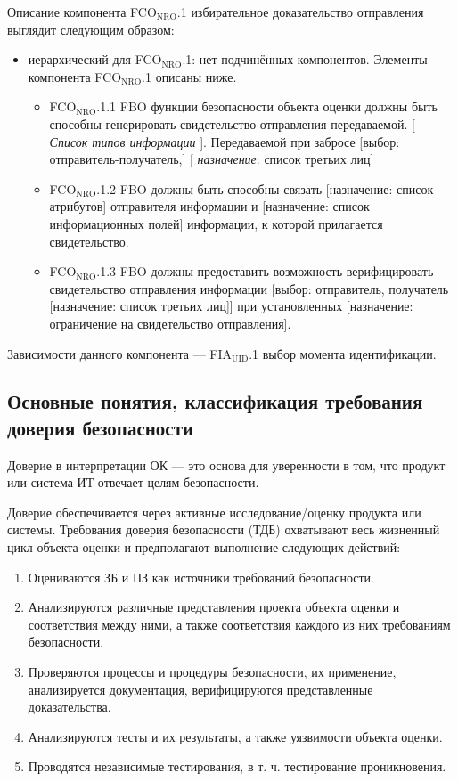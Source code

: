 \documentclass[12pt, russian, oneside, article]{ncc}
\begin{document}
Описание компонента FCO$_{\mathrm{NRO}}$.1 избирательное доказательство отправления выглядит следующим образом:
\begin{itemize}
\item иерархический для FCO$_{\mathrm{NRO}}$.1: нет подчинённых компонентов. Элементы компонента FCO$_{\mathrm{NRO}}$.1 описаны ниже.

\begin{itemize}
\item FCO$_{\mathrm{NRO}}$.1.1 FBO функции безопасности объекта оценки должны быть способны генерировать свидетельство отправления передаваемой. [ \emph{Список типов информации} ]. Передаваемой при забросе [выбор: отправитель-получатель,] [ \emph{назначение}: список третьих лиц]
\item FCO$_{\mathrm{NRO}}$.1.2 FBO должны быть способны связать [назначение: список атрибутов] отправителя информации и [назначение: список информационных полей] информации, к которой прилагается свидетельство.
\item FCO$_{\mathrm{NRO}}$.1.3 FBO должны предоставить возможность верифицировать свидетельство отправления информации [выбор: отправитель, получатель [назначение: список третьих лиц]] при установленных [назначение: ограничение на свидетельство отправления].
\end{itemize}

\end{itemize}

Зависимости данного компонента --- FIA$_{\mathrm{UID}}$.1 выбор момента идентификации.
\subsection{Основные понятия, классификация требования доверия безопасности}
\label{sec-3_3}


Доверие в интерпретации ОК --- это основа для уверенности в том, что продукт или система ИТ отвечает целям безопасности.

Доверие обеспечивается через активные исследование/оценку продукта или системы. Требования доверия безопасности (ТДБ) охватывают весь жизненный цикл объекта оценки и предполагают выполнение следующих действий:
\begin{enumerate}
\item Оцениваются ЗБ и ПЗ как источники требований безопасности.
\item Анализируются различные представления проекта объекта оценки и соответствия между ними, а также соответствия каждого из них требованиям безопасности.
\item Проверяются процессы и процедуры безопасности, их применение, анализируется документация, верифицируются представленные доказательства.
\item Анализируются тесты и их результаты, а также уязвимости объекта оценки.
\item Проводятся независимые тестирования, в т. ч. тестирование проникновения.
\end{enumerate}
\end{document}
